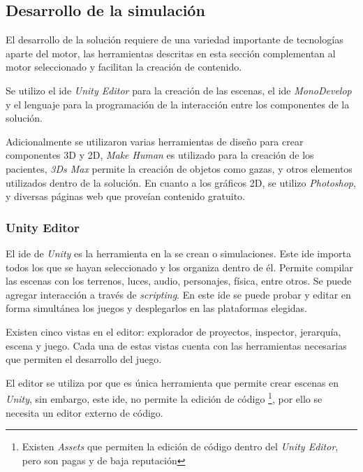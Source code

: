 \subsection{Desarrollo de la simulación}

El desarrollo de la solución requiere de una variedad importante de tecnologías
aparte del motor, las herramientas descritas en esta sección complementan al
motor seleccionado y facilitan la creación de contenido.

Se utilizo el \Gls{ide} \textit{Unity Editor} para la creación de las escenas,
el \Gls{ide} \textit{MonoDevelop} y el lenguaje \cs{} para la programación de la
interacción entre los componentes de la solución.

Adicionalmente se utilizaron varias herramientas de diseño para crear
componentes 3D y 2D, \textit{Make Human} es utilizado para la creación de los
pacientes, \textit{3Ds Max} permite la creación de objetos como gazas, y otros
elementos utilizados dentro de la solución. En cuanto a los gráficos 2D, se
utilizo \textit{Photoshop}, y diversas páginas web que proveían contenido
gratuito.

\subsubsection{Unity Editor}


El \Gls{ide} de \textit{Unity} es la herramienta en la se crean  o simulaciones. Este \Gls{ide} importa todos los
 que se hayan seleccionado y los organiza dentro de él.
Permite compilar las escenas con los terrenos, luces, audio, personajes, física,
entre otros. Se puede agregar interacción a través de \textit{scripting}. En
este \Gls{ide} se puede probar y editar en forma simultánea los juegos y
desplegarlos en las plataformas elegidas\cite{unity3d}. 

Existen cinco vistas en el editor: explorador de proyectos, inspector,
jerarquía, escena y juego. Cada una de estas vistas cuenta con las herramientas
necesarias que permiten el desarrollo del juego\cite{unity3d}.

El editor se utiliza por que es única herramienta que permite crear escenas en
\textit{Unity}, sin embargo, este \Gls{ide}, no permite la edición de código
\footnote{Existen \textit{Assets} que permiten la edición de código dentro del
    \textit{Unity Editor}, pero son pagas y de baja reputación}, por ello se
necesita un editor externo de código.


